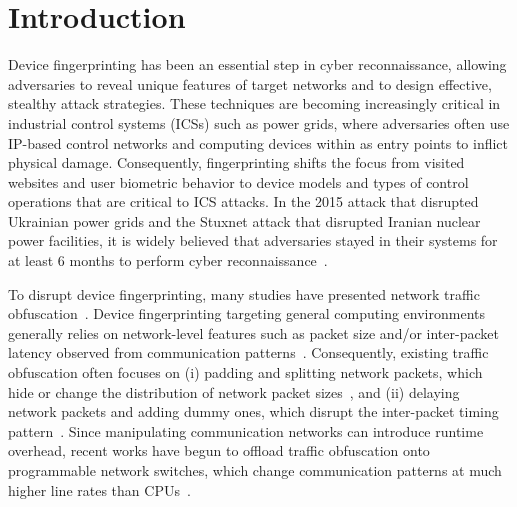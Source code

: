 \section{Introduction}
\label{sec:intro}

Device fingerprinting has been an essential step in cyber reconnaissance, allowing adversaries
to reveal unique features of target networks and to design effective, stealthy attack
strategies. These techniques are becoming increasingly critical in industrial control systems
(ICSs) such as power grids, where adversaries often use IP-based control networks and computing
devices within as entry points to inflict physical damage. Consequently, fingerprinting shifts
the focus from visited websites and user biometric behavior to device models and types of
control operations that are critical to ICS attacks. In the 2015 attack that disrupted Ukrainian
power grids and the Stuxnet attack that disrupted Iranian nuclear power facilities, it is widely
believed that adversaries stayed in their systems for at least 6 months to perform cyber
reconnaissance~\cite{ukraine2015, stuxnet2011}.

To disrupt device fingerprinting, many studies have presented network traffic
obfuscation~\cite{wright2009, dyer2012}. Device
fingerprinting targeting general computing environments generally relies on network-level
features such as packet size and/or inter-packet latency observed from communication
patterns~\cite{sirinam2018}. Consequently, existing traffic
obfuscation often focuses on (i) padding and splitting network packets, which hide or change the
distribution of network packet sizes~\cite{wright2009, walkietalkie2017, panchenko2016}, and (ii)
delaying network packets and adding dummy ones, which disrupt the inter-packet timing
pattern~\cite{dyer2012, tamaraw2014, wang2008dlp, juarez2016}. Since manipulating
communication networks can introduce runtime overhead, recent works have begun to offload
traffic obfuscation onto programmable network switches, which change communication patterns at
much higher line rates than CPUs~\cite{ditto2022, minos2025, securitas2026}.

